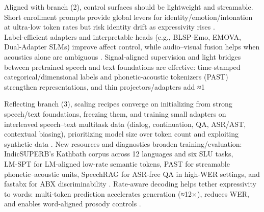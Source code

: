 \documentclass{article}
\begin{document}
Aligned with branch (2), control surfaces should be lightweight and streamable. Short enrollment prompts provide global levers for identity/emotion/intonation at ultra‑low token rates but risk identity drift as expressivity rises \cite{wang2024evaluatingtextspeechsynthesislargediscre}. Label‑efficient adapters and interpretable heads (e.g., BLSP‑Emo, EMOVA, Dual‑Adapter SLMs) improve affect control, while audio–visual fusion helps when acoustics alone are ambiguous \cite{wang2024blspemotowardsempatheticlargespeechlangu,chen2025emovaempoweringlanguagemodelsseehearspea,wang2025dualinformationspeechlanguagemodelsemoti}. Signal‑aligned supervision and light bridges between pretrained speech and text foundations are effective: time‑stamped categorical/dimensional labels and phonetic‑acoustic tokenizers (PAST) strengthen representations, and thin projectors/adapters add ≈1%

Reflecting branch (3), scaling recipes converge on initializing from strong speech/text foundations, freezing them, and training small adapters on interleaved speech–text multitask data (dialog, continuation, QA, ASR/AST, contextual biasing), prioritizing model size over token count and exploiting synthetic data \cite{maimon2025scalinganalysisinterleavedspeechtextlang,wang2023slmbridgethingapbetweenspeechtextfoundat}. New resources and diagnostics broaden training/evaluation: IndicSUPERB’s Kathbath corpus across 12 languages and six SLU tasks, LM‑SPT for LM‑aligned low‑rate semantic tokens, PAST for streamable phonetic–acoustic units, SpeechRAG for ASR‑free QA in high‑WER settings, and fastabx for ABX discriminability \cite{entry2025indicsuperbspeechprocessinguniversalperf,jo2025lmsptalignedsemanticdistillationspeechto,har-tuv2025pastphoneticacousticspeechtokenizer,min2025speechretrievalaugmentedgenerationwithou,poli2025fastabxlibraryefficientcomputationabxdis}. Rate‑aware decoding helps tether expressivity to words: multi‑token prediction accelerates generation (≈12×), reduces WER, and enables word‑aligned prosody controls \cite{qian2025prosodylmuncoveringemergingprosodyproces,fan2025whatmakesgoodspeechtokenizerllmcentricge}.
\end{document}

